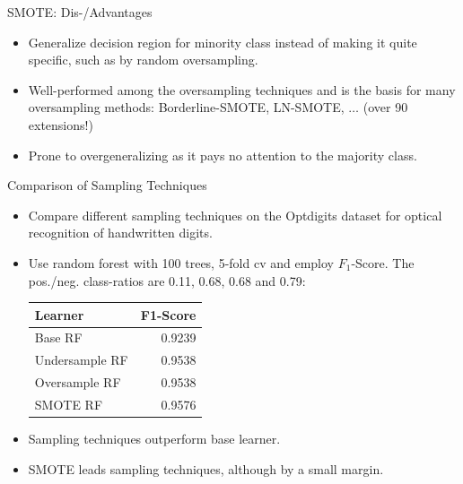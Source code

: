 \documentclass[11pt,compress,t,notes=noshow, xcolor=table]{beamer}
\begin{document}
\begin{frame}{SMOTE: Dis-/Advantages}

    \begin{itemize}
    
        \item Generalize decision region for minority class instead of making it quite specific, such as by random oversampling. 
        
        \item Well-performed among the oversampling techniques and is the basis for many oversampling methods: Borderline-SMOTE, LN-SMOTE, $\ldots$ (over 90 extensions!)
    
        \item Prone to overgeneralizing as it pays no attention to the majority class.

    \end{itemize}		

\end{frame}

\begin{frame}{Comparison of Sampling Techniques}

    \begin{itemize}
    
        \item Compare different sampling techniques on the Optdigits dataset for optical recognition of handwritten digits.
    
        \item Use random forest with 100 trees, 5-fold cv and employ $F_1$-Score. The pos./neg. class-ratios are 0.11, 0.68, 0.68 and 0.79:
           \begin{center}
             \begin{tabular}{lr}
             \toprule
             Learner & F1-Score\\
             \midrule
             Base RF & 0.9239\\
             Undersample RF & 0.9538\\
             Oversample RF & 0.9538\\
             SMOTE RF & 0.9576\\
             \bottomrule
             \end{tabular}    
            \end{center}
            
        \item Sampling techniques outperform base learner. \item SMOTE leads sampling techniques, although by a small margin.

    \end{itemize}		

\end{frame}


\endlecture
\end{document}
